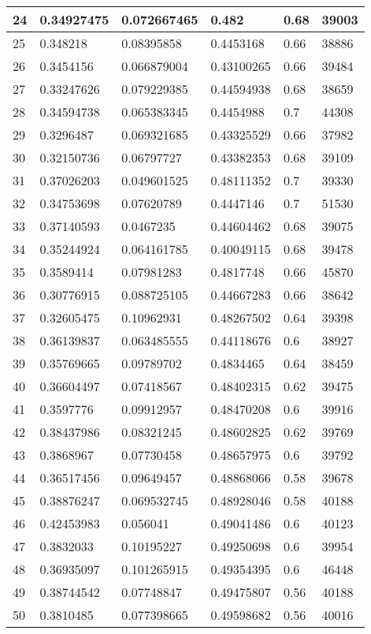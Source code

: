 \begin{longtable}{|l|l|l|l|l|l|}
24 & 0.34927475 & 0.072667465 & 0.482 & 0.68 & 39003 \\ \hline 
25 & 0.348218 & 0.08395858 & 0.4453168 & 0.66 & 38886 \\ \hline 
26 & 0.3454156 & 0.066879004 & 0.43100265 & 0.66 & 39484 \\ \hline 
27 & 0.33247626 & 0.079229385 & 0.44594938 & 0.68 & 38659 \\ \hline 
28 & 0.34594738 & 0.065383345 & 0.4454988 & 0.7 & 44308 \\ \hline 
29 & 0.3296487 & 0.069321685 & 0.43325529 & 0.66 & 37982 \\ \hline 
30 & 0.32150736 & 0.06797727 & 0.43382353 & 0.68 & 39109 \\ \hline 
31 & 0.37026203 & 0.049601525 & 0.48111352 & 0.7 & 39330 \\ \hline 
32 & 0.34753698 & 0.07620789 & 0.4447146 & 0.7 & 51530 \\ \hline 
33 & 0.37140593 & 0.0467235 & 0.44604462 & 0.68 & 39075 \\ \hline 
34 & 0.35244924 & 0.064161785 & 0.40049115 & 0.68 & 39478 \\ \hline 
35 & 0.3589414 & 0.07981283 & 0.4817748 & 0.66 & 45870 \\ \hline 
36 & 0.30776915 & 0.088725105 & 0.44667283 & 0.66 & 38642 \\ \hline 
37 & 0.32605475 & 0.10962931 & 0.48267502 & 0.64 & 39398 \\ \hline 
38 & 0.36139837 & 0.063485555 & 0.44118676 & 0.6 & 38927 \\ \hline 
39 & 0.35769665 & 0.09789702 & 0.4834465 & 0.64 & 38459 \\ \hline 
40 & 0.36604497 & 0.07418567 & 0.48402315 & 0.62 & 39475 \\ \hline 
41 & 0.3597776 & 0.09912957 & 0.48470208 & 0.6 & 39916 \\ \hline 
42 & 0.38437986 & 0.08321245 & 0.48602825 & 0.62 & 39769 \\ \hline 
43 & 0.3868967 & 0.07730458 & 0.48657975 & 0.6 & 39792 \\ \hline 
44 & 0.36517456 & 0.09649457 & 0.48868066 & 0.58 & 39678 \\ \hline 
45 & 0.38876247 & 0.069532745 & 0.48928046 & 0.58 & 40188 \\ \hline 
46 & 0.42453983 & 0.056041 & 0.49041486 & 0.6 & 40123 \\ \hline 
47 & 0.3832033 & 0.10195227 & 0.49250698 & 0.6 & 39954 \\ \hline 
48 & 0.36935097 & 0.101265915 & 0.49354395 & 0.6 & 46448 \\ \hline 
49 & 0.38744542 & 0.07748847 & 0.49475807 & 0.56 & 40188 \\ \hline 
50 & 0.3810485 & 0.077398665 & 0.49598682 & 0.56 & 40016 \\ \hline 
\end{longtable}